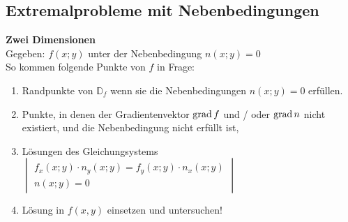 \subsection{Extremalprobleme mit Nebenbedingungen}
\textbf{Zwei Dimensionen}\\
Gegeben: $f(x;y)$ unter der Nebenbedingung $n(x;y) = 0$\\
So kommen folgende Punkte von $f$ in Frage:
\begin{enumerate}
  \item Randpunkte von $\mathbb{D}_f$ wenn sie die Nebenbedingungen  $n(x;y) = 0$ erfüllen.
  \item Punkte, in denen der Gradientenvektor $\operatorname{grad} f $ und / oder $\operatorname{grad} n$ nicht existiert, und die Nebenbedingung nicht erfüllt ist,
  \item Lösungen des Gleichungsystems\\
  $ \begin{vmatrix}
      f_x(x;y) \cdot n_y(x;y) = f_y(x;y) \cdot n_x(x;y) \\
      n(x;y) = 0
    \end{vmatrix} $
   \item Lösung in $f(x,y)$ einsetzen und untersuchen!
\end{enumerate}
